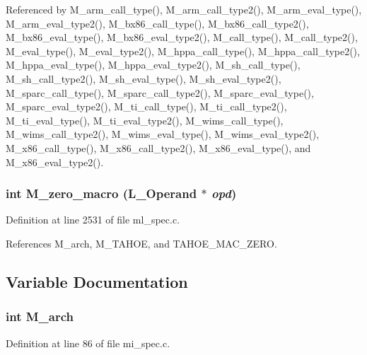 Referenced by M\_\-arm\_\-call\_\-type(), M\_\-arm\_\-call\_\-type2(), M\_\-arm\_\-eval\_\-type(), M\_\-arm\_\-eval\_\-type2(), M\_\-bx86\_\-call\_\-type(), M\_\-bx86\_\-call\_\-type2(), M\_\-bx86\_\-eval\_\-type(), M\_\-bx86\_\-eval\_\-type2(), M\_\-call\_\-type(), M\_\-call\_\-type2(), M\_\-eval\_\-type(), M\_\-eval\_\-type2(), M\_\-hppa\_\-call\_\-type(), M\_\-hppa\_\-call\_\-type2(), M\_\-hppa\_\-eval\_\-type(), M\_\-hppa\_\-eval\_\-type2(), M\_\-sh\_\-call\_\-type(), M\_\-sh\_\-call\_\-type2(), M\_\-sh\_\-eval\_\-type(), M\_\-sh\_\-eval\_\-type2(), M\_\-sparc\_\-call\_\-type(), M\_\-sparc\_\-call\_\-type2(), M\_\-sparc\_\-eval\_\-type(), M\_\-sparc\_\-eval\_\-type2(), M\_\-ti\_\-call\_\-type(), M\_\-ti\_\-call\_\-type2(), M\_\-ti\_\-eval\_\-type(), M\_\-ti\_\-eval\_\-type2(), M\_\-wims\_\-call\_\-type(), M\_\-wims\_\-call\_\-type2(), M\_\-wims\_\-eval\_\-type(), M\_\-wims\_\-eval\_\-type2(), M\_\-x86\_\-call\_\-type(), M\_\-x86\_\-call\_\-type2(), M\_\-x86\_\-eval\_\-type(), and M\_\-x86\_\-eval\_\-type2().
\subsubsection{\setlength{\rightskip}{0pt plus 5cm}int M\_\-zero\_\-macro (L\_\-Operand $\ast$ {\em opd})}\label{m__spec_8h_f718c396d2c4b99bddea75fc51c722e0}




Definition at line 2531 of file ml\_\-spec.c.

References M\_\-arch, M\_\-TAHOE, and TAHOE\_\-MAC\_\-ZERO.

\subsection{Variable Documentation}
\subsubsection{\setlength{\rightskip}{0pt plus 5cm}int \bf{M\_\-arch}}\label{m__spec_8h_459f82172b68fe91c09e0c89d4d55cfa}




Definition at line 86 of file mi\_\-spec.c.

